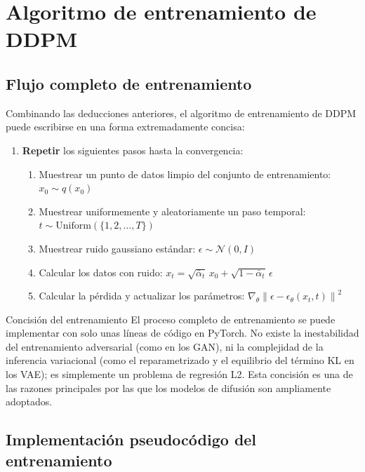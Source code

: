 \section{Algoritmo de entrenamiento de DDPM}

\subsection{Flujo completo de entrenamiento}

Combinando las deducciones anteriores, el algoritmo de entrenamiento de DDPM puede escribirse en una forma extremadamente concisa:

\begin{enumerate}
    \item \textbf{Repetir} los siguientes pasos hasta la convergencia:
    \begin{enumerate}
        \item Muestrear un punto de datos limpio del conjunto de entrenamiento: $x_0 \sim q(x_0)$
        \item Muestrear uniformemente y aleatoriamente un paso temporal: $t \sim \text{Uniform}(\{1, 2, \dots, T\})$
        \item Muestrear ruido gaussiano estándar: $\epsilon \sim \mathcal{N}(0, I)$
        \item Calcular los datos con ruido: $x_t = \sqrt{\bar{\alpha}_t}\, x_0 + \sqrt{1 - \bar{\alpha}_t}\, \epsilon$
        \item Calcular la pérdida y actualizar los parámetros: $\nabla_\theta \left\| \epsilon - \epsilon_\theta(x_t, t) \right\|^2$
    \end{enumerate}
\end{enumerate}

\begin{knowledgebox}{Concisión del entrenamiento}
El proceso completo de entrenamiento se puede implementar con solo unas líneas de código en PyTorch. No existe la inestabilidad del entrenamiento adversarial (como en los GAN), ni la complejidad de la inferencia variacional (como el reparametrizado y el equilibrio del término KL en los VAE); es simplemente un problema de regresión L2. Esta concisión es una de las razones principales por las que los modelos de difusión son ampliamente adoptados.
\end{knowledgebox}

\subsection{Implementación pseudocódigo del entrenamiento}

